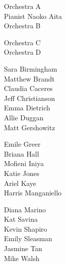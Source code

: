 \documentclass{article}[10pt]
\begin{document}
\begin{center}
        \begin{minipage}{0.6\textwidth}
            \begin{multicols}{2}
                \begin{center}
                    \begin{small}
                        {Orchestra A}\\
{Pianist Naoko Aita}\\
{Orchestra B}\null
\columnbreak

{Orchestra C}\\
{Orchestra D}
                    \end{small}
                \end{center}
            \end{multicols}
        \end{minipage}

        \vspace{-0.05in}
        \begin{multicols}{3}
            \begin{center}
                \begin{small}
                    {Sara Birmingham}\\
{Matthew Brandt}\\
{Claudia Caceres}\\
{Jeff Christianson}\\
{Emma Dietrich}\\
{Allie Duggan}\\
{Matt Gershowitz}\null
\columnbreak

{Emile Greer}\\
{Briana Hall}\\
{Mofieni Iniya}\\
{Katie Jones}\\
{Ariel Kaye}\\
{Harris Manganiello}\null
\columnbreak

{Diana Marino}\\
{Kat Savina}\\
{Kevin Shapiro}\\
{Emily Sleasman}\\
{Jasmine Tan}\\
{Mike Walsh}
                \end{small}
            \end{center}
        \end{multicols}

    \end{center}
    \vfill
\end{document}
